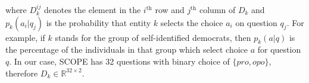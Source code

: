 where $D_k^{ij}$ denotes the element in the $i^\text{th}$ row and $j^\text{th}$ column of $D_k$ and  $p_k(a_i|q_j)$  is the probability that entity $k$ selects the choice $a_i$ on  question $q_j$. For example, if $k$ stands for the group of self-identified democrats, then $p_k(a|q)$ is the percentage of the individuals in that group which select choice $a$ for question $q$.
In our case, \textsc{SCOPE} has 32 questions with binary choice of $\{\mathrm{\textit{pro}},\mathrm{\textit{opo}}\}$, therefore $D_{k} \in \mathbb{R}^{32 \times 2}$.


